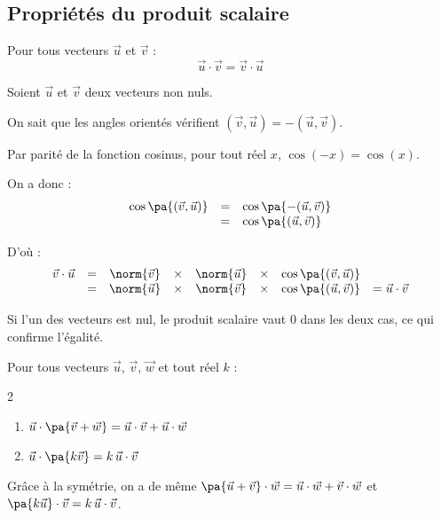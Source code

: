 \subsection{Propriétés du produit scalaire}

\begin{prop}[Symétrie]
	Pour tous vecteurs $\vec{u}$ et $\vec{v}$ :
	\[
		\vec{u}\cdot\vec{v} = \vec{v}\cdot\vec{u}
	\]
\end{prop}

\begin{demo}
	\begin{demo}
		Soient $\vec{u}$ et $\vec{v}$ deux vecteurs non nuls.

		On sait que les angles orientés vérifient $(\vec{v},\vec{u}) = -(\vec{u},\vec{v})$.

		Par parité de la fonction cosinus, pour tout réel $x$, $\cos(-x) = \cos(x)$.

		On a donc :
		\[
			\begin{array}{rcl}
				\cos\pa{(\vec{v},\vec{u})} & = & \cos\pa{-(\vec{u},\vec{v})} \\
				                           & = & \cos\pa{(\vec{u},\vec{v})}
			\end{array}
		\]

		D'où :
		\[
			\begin{array}{rccccccl}
				\vec{v}\cdot\vec{u} & = & \norm{\vec{v}} & \times & \norm{\vec{u}} & \times & \cos\pa{(\vec{v},\vec{u})} &                       \\
				                    & = & \norm{\vec{u}} & \times & \norm{\vec{v}} & \times & \cos\pa{(\vec{u},\vec{v})} & = \vec{u}\cdot\vec{v}
			\end{array}
		\]

		Si l'un des vecteurs est nul, le produit scalaire vaut $0$ dans les deux cas, ce qui confirme l'égalité.
	\end{demo}
\end{demo}

\begin{prop}
	Pour tous vecteurs $\vec{u}$, $\vec{v}$, $\vec{w}$ et tout réel $k$ :
	\begin{multicols}{2}
		\begin{enumerate}
			\item $\vec{u}\cdot\pa{\vec{v} + \vec{w}} = \vec{u}\cdot\vec{v} + \vec{u}\cdot\vec{w}$
			\item $\vec{u}\cdot\pa{k\vec{v}} = k\,\vec{u}\cdot\vec{v}$
		\end{enumerate}
	\end{multicols}

	Grâce à la symétrie, on a de même $\pa{\vec{u} + \vec{v}}\cdot\vec{w} = \vec{u}\cdot\vec{w} + \vec{v}\cdot\vec{w}$ et $\pa{k\vec{u}}\cdot\vec{v} = k\,\vec{u}\cdot\vec{v}$.
\end{prop}

